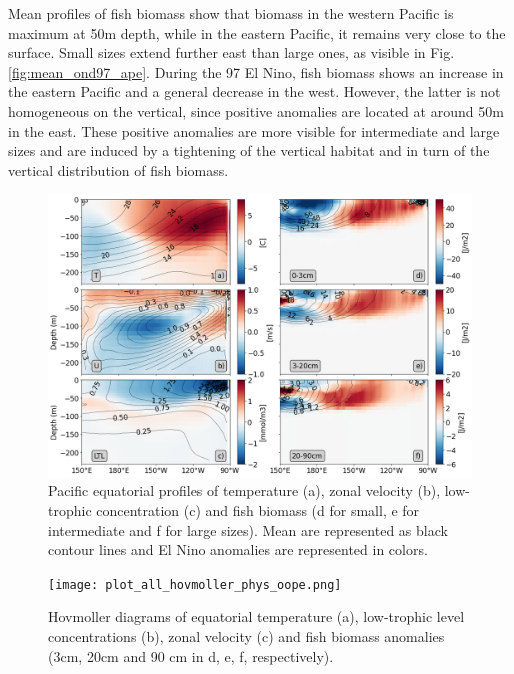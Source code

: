 Mean profiles of fish biomass show that biomass in the western Pacific is maximum at 50m depth, while in the eastern Pacific, it remains very close to the surface. Small sizes extend further east than large ones, as visible in Fig.\ref{fig:mean_ond97_ape}. During the 97 El Nino, fish biomass shows an increase in the eastern Pacific and a general decrease in the west. However,  the latter is not homogeneous on the vertical, since positive anomalies are located at around 50m in the east. These positive anomalies are more visible for intermediate and large sizes and are induced by a tightening of the vertical habitat and in turn of the vertical distribution of fish biomass.


\begin{figure}
	\centering
	\includegraphics[scale=0.4]{figs/forage_mean_ond97.png}	
	\caption{Pacific equatorial profiles of temperature (a), zonal velocity (b), low-trophic concentration (c) and fish biomass (d for small, e for intermediate and f for large sizes). Mean are represented as black contour lines and El Nino anomalies are represented in colors.}	
	\label{fig:profiles}
\end{figure}

\begin{figure}
	\centering
	\texttt{[image: plot\_all\_hovmoller\_phys\_oope.png]}	
	\caption{Hovmoller diagrams of equatorial temperature (a), low-trophic level concentrations (b), zonal velocity (c) and fish biomass anomalies (3cm, 20cm and 90 cm in d, e, f, respectively).}	
	\label{fig:hov_nemo_ape}
\end{figure}

